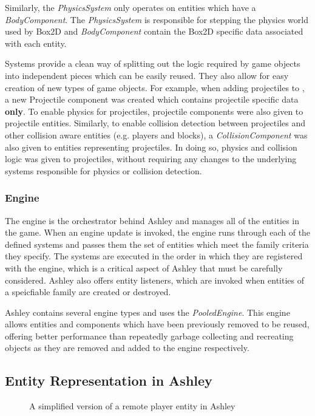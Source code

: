 Similarly, the \textit{PhysicsSystem} only operates on entities which have a \textit{BodyComponent}. The \textit{PhysicsSystem} is responsible for stepping the physics world used by Box2D and \textit{BodyComponent} contain the Box2D specific data associated with each entity.

Systems provide a clean way of splitting out the logic required by game objects into independent pieces which can be easily reused. They also allow for easy creation of new types of game objects. For example, when adding projectiles to \game{}, a new Projectile component was created which contains projectile specific data \textbf{only}. To enable physics for projectiles, projectile components were also given to projectile entities. Similarly, to enable collision detection between projectiles and other collision aware entities (e.g. players and blocks), a \textit{CollisionComponent} was also given to entities representing projectiles. In doing so, physics and collision logic was given to projectiles, without requiring any changes to the underlying systems responsible for physics or collision detection.

\subsubsection{Engine}
The engine is the orchestrator behind Ashley and manages all of the entities in the game. When an engine update is invoked, the engine runs through each of the defined systems and passes them the set of entities which meet the family criteria they specify. The systems are executed in the order in which they are registered with the engine, which is a critical aspect of Ashley that must be carefully considered. Ashley also offers entity listeners, which are invoked when entities of a speicfiable family are created or destroyed.

Ashley contains several engine types and \game{} uses the \textit{PooledEngine}. This engine allows entities and components  which have been previously removed to be reused, offering better performance than repeatedly garbage collecting and recreating objects as they are removed and added to the engine respectively. 
 
\subsection{Entity Representation in Ashley}

\begin{figure}[H]
    \centering
    \caption{A simplified version of a remote player entity in Ashley}
    \label{fig:impl:ashley}
\end{figure}


